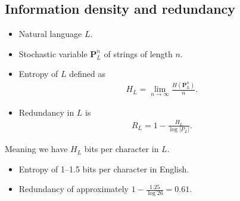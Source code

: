 \documentclass{beamer}
\let\stoch\mathbf{}
\begin{document}
\subsection{Information density and redundancy}

\begin{frame}
  \begin{definition}
    \begin{itemize}
      \item Natural language \(L\).
      \item Stochastic variable \(\stoch P^n_L\) of strings of length \(n\).
      \item Entropy of \(L\) defined as
        \begin{align*}
          H_L = \lim_{n\to \infty}\frac{H(\stoch P^n_L)}{n}.
        \end{align*}
      \item Redundancy in \(L\) is
        \begin{align*}
          R_L = 1 - \frac{H_L}{\log |P_L|}.
        \end{align*}
    \end{itemize}
  \end{definition}
\end{frame}

\begin{frame}
  \begin{remark}
    Meaning we have \(H_L\) bits per character in \(L\).
  \end{remark}

  \begin{example}
    \begin{itemize}
      \item Entropy of 1--1.5 bits per character in English.
      \item Redundancy of approximately \(1 - \frac{1.25}{\log 26} = 0.61\).
    \end{itemize}
  \end{example}

\end{frame}
\end{document}
